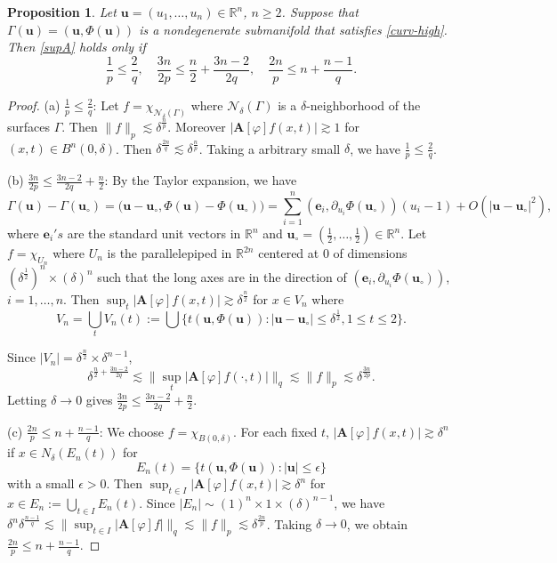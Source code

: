 \documentclass[10pt] %
{amsart}
\theoremstyle{plain}
\newtheorem{prop}[thm]{Proposition}
\numberwithin{equation}{section}
\newcommand{\R}{\mathbb R}
\begin{document}
 
\begin{prop}\label{prop:nece-high}
Let $\mathbf u = (u_1,\dots,u_n) \in \mathbb R^n$, $n\ge 2$. Suppose that $\Gamma(\mathbf u)=(\mathbf u,\Phi(\mathbf u))$ is a nondegenerate submanifold that satisfies \eqref{curv-high}.  
Then \eqref{supA} holds only if  
\[
\frac 1p\le \frac {2}{q}, \quad \frac{3n}{2p} \le  \frac n2+\frac{3n-2}{2q}, \quad \frac{2n}p \le n+ \frac{n-1}q.
\]
\end{prop}
 

\begin{proof}
(a) $\frac 1p \le \frac{2}q$:
Let $f=\chi_{\mathcal N_\delta(\Gamma)}$ where $\mathcal N_\delta(\Gamma)$ is a $\delta$-neighborhood of the surfaces $\Gamma$.
Then $\|f\|_p \lesssim \delta^{\frac np}$. Moreover $|\mathbf A[\varphi]f(x,t)|\gtrsim 1$ for $(x,t)\in B^n(0,\delta)$. Then $\delta^{\frac {2n}q} \lesssim \delta^{\frac np}$. Taking a arbitrary small $\delta$, we have $\frac1p \le \frac 2q$.

\smallskip

\noindent(b) $\frac{3n}{2p} \le \frac{3n-2}{2q}+\frac n2$: 
By the Taylor expansion, we have
\[
\Gamma(\mathbf u) - \Gamma(\mathbf u_\circ) = \big(\mathbf u-\mathbf u_\circ,\Phi(\mathbf u)-\Phi(\mathbf u_\circ)\big)
=\sum_{i=1}^n (\mathbf e_i,\partial_{u_i}\Phi(\mathbf u_\circ))(u_i-1)+O(|\mathbf u-\mathbf u_\circ|^2) ,
\]
where $\mathbf e_i's$ are the standard unit vectors in $\R^n$ and $\mathbf u_\circ=(\frac 12,\dots,\frac12) \in \R^n$.
Let $f=\chi_{U_n}$ where $U_n$ is the parallelepiped in $\R^{2n}$ centered at $0$ of dimensions $(\delta^{\frac12})^n\times(\delta)^n$ such that the long axes are in the direction of $(\mathbf e_{i}, \partial_{u_i}\Phi(\mathbf u_\circ))$, $i=1,\dots,n$.  
Then  $\sup_t|\mathbf A[\varphi] f(x,t)|\gtrsim \delta^{\frac n2}$ for $x\in V_n$
where \[
V_n=\bigcup_t V_{n}(t) := \bigcup\big\{t(\mathbf u,\Phi(\mathbf u)):|\mathbf u-\mathbf u_\circ|\le \delta^{\frac12}, 1\le t\le2\big\}.
\]

Since  $|V_n|=\delta^{\frac n2}\times \delta^{n-1}$,
\[
\delta^{\frac n2+\frac{3n-2}{2q}}\lesssim \|\sup_t| \mathbf A[\varphi] f(\cdot,t)| \|_q \lesssim \|f\|_p \lesssim \delta^{\frac {3n}{2p}}.
\]
Letting $\delta\rightarrow 0$ gives $\frac{3n}{2p} \le \frac{3n-2}{2q}+\frac n2$.

 
\smallskip

\noindent (c) $\frac{2n}p \le n+\frac{n-1}q$: We choose $f=\chi_{B(0,\delta)}$. 
For each fixed $t$, $|\mathbf A[\varphi] f(x,t)|\gtrsim \delta^{n}$ if $x \in N_\delta(E_n(t)) $  for
\[
E_n(t)=\{t(\mathbf u,\Phi(\mathbf u)): |\mathbf u|\le \epsilon\} \] 
with a small $\epsilon>0$.
Then $\sup_{t \in I}|\mathbf A[\varphi] f(x,t)|\gtrsim \delta^n$ for $x\in E_n:=\bigcup_{t \in I} E_n(t)$. 
Since $|E_n|\sim(1)^n\times 1\times (\delta)^{n-1}$, we have
 $\delta^{n}\delta^{\frac{n-1}q} \lesssim \|\sup_{t \in I}|\mathbf A[\varphi] f|\|_q \lesssim \|f\|_p \lesssim \delta^{\frac{2n}p}$.
 Taking $\delta \rightarrow0$, we obtain $\frac{2n}p \le n+\frac{n-1}q$.
\end{proof}
\end{document}
